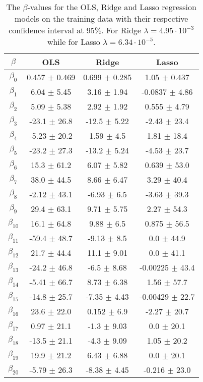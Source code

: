 \documentclass[uio,jmp,amsmath,amssymb,reprint,nofootinbib]{revtex4-1}
\numberwithin{equation}{section}
\begin{document}
\begin{table}[H]
\begin{tabular}{|c|c|c|c|}\hline
\(\beta\) & OLS & Ridge & Lasso \\ \hline
\(\beta_{0}\) & 0.457 \(\pm\) 0.469 & 0.699 \(\pm\) 0.285 & 1.05 \(\pm\) 0.437 \\ \hline
\(\beta_{1}\) & 6.04 \(\pm\) 5.45 & 3.16 \(\pm\) 1.94 & -0.0837 \(\pm\) 4.86 \\ \hline
\(\beta_{2}\) & 5.09 \(\pm\) 5.38 & 2.92 \(\pm\) 1.92 & 0.555 \(\pm\) 4.79 \\ \hline
\(\beta_{3}\) & -23.1 \(\pm\) 26.8 & -12.5 \(\pm\) 5.22 & -2.43 \(\pm\) 23.4 \\ \hline
\(\beta_{4}\) & -5.23 \(\pm\) 20.2 & 1.59 \(\pm\) 4.5 & 1.81 \(\pm\) 18.4 \\ \hline
\(\beta_{5}\) & -23.2 \(\pm\) 27.3 & -13.2 \(\pm\) 5.24 & -4.53 \(\pm\) 23.7 \\ \hline
\(\beta_{6}\) & 15.3 \(\pm\) 61.2 & 6.07 \(\pm\) 5.82 & 0.639 \(\pm\) 53.0 \\ \hline
\(\beta_{7}\) & 38.0 \(\pm\) 44.5 & 8.66 \(\pm\) 6.47 & 3.29 \(\pm\) 40.4 \\ \hline
\(\beta_{8}\) & -2.12 \(\pm\) 43.1 & -6.93 \(\pm\) 6.5 & -3.63 \(\pm\) 39.3 \\ \hline
\(\beta_{9}\) & 29.4 \(\pm\) 63.1 & 9.71 \(\pm\) 5.75 & 2.27 \(\pm\) 54.3 \\ \hline
\(\beta_{10}\) & 16.1 \(\pm\) 64.8 & 9.88 \(\pm\) 6.5 & 0.875 \(\pm\) 56.5 \\ \hline
\(\beta_{11}\) & -59.4 \(\pm\) 48.7 & -9.13 \(\pm\) 8.5 & 0.0 \(\pm\) 44.9 \\ \hline
\(\beta_{12}\) & 21.7 \(\pm\) 44.4 & 11.1 \(\pm\) 9.01 & 0.0 \(\pm\) 41.1 \\ \hline
\(\beta_{13}\) & -24.2 \(\pm\) 46.8 & -6.5 \(\pm\) 8.68 & -0.00225 \(\pm\) 43.4 \\ \hline
\(\beta_{14}\) & -5.41 \(\pm\) 66.7 & 8.73 \(\pm\) 6.38 & 1.56 \(\pm\) 57.7 \\ \hline
\(\beta_{15}\) & -14.8 \(\pm\) 25.7 & -7.35 \(\pm\) 4.43 & -0.00429 \(\pm\) 22.7 \\ \hline
\(\beta_{16}\) & 23.6 \(\pm\) 22.0 & 0.152 \(\pm\) 6.9 & -2.27 \(\pm\) 20.7 \\ \hline
\(\beta_{17}\) & 0.97 \(\pm\) 21.1 & -1.3 \(\pm\) 9.03 & 0.0 \(\pm\) 20.1 \\ \hline
\(\beta_{18}\) & -13.5 \(\pm\) 21.1 & -4.3 \(\pm\) 9.09 & 1.05 \(\pm\) 20.2 \\ \hline
\(\beta_{19}\) & 19.9 \(\pm\) 21.2 & 6.43 \(\pm\) 6.88 & 0.0 \(\pm\) 20.1 \\ \hline
\(\beta_{20}\) & -5.79 \(\pm\) 26.3 & -8.38 \(\pm\) 4.45 & -0.216 \(\pm\) 23.0 \\ \hline
\end{tabular}
\caption{The \(\beta\)-values for the OLS, Ridge and Lasso regression models on the training data with their respective confidence interval at \(95\%\). For Ridge \(\lambda = 4.95\cdot 10^{-3}\) while for Lasso \(\lambda = 6.34\cdot 10^{-5}\).}
\label{tab:13}
\end{table}
\end{document}
